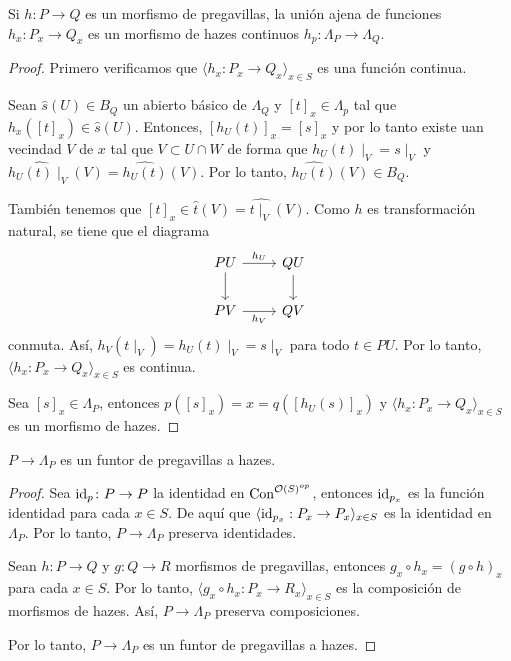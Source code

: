 \begin{lema}
Si $h\colon P\to Q$ es un morfismo de pregavillas, la unión ajena de funciones $h_x\colon P_x\to Q_x$ es un morfismo de hazes continuos $h_p\colon \Lambda_P\to \Lambda_Q$.
\end{lema}

\begin{proof}
Primero verificamos que $\langle h_x: P_x\to Q_x\rangle_{x\in S}$ es una función continua.

Sean $\hat{s}(U)\in B_Q$ un abierto básico de $\Lambda_Q$ y $[t]_x\in \Lambda_p$ tal que $h_x([t]_x)\in \hat{s}(U)$. Entonces, $[h_U(t)]_x=[s]_x$ y por lo tanto existe uan vecindad $V$ de $x$ tal que $V\subset U\cap W$ 
de forma que $h_U(t)\mid_V=s\mid_V$ y $\widehat{h_U(t)\mid_V}(V)=\widehat{h_U(t)}(V)$. Por lo tanto, $\widehat{h_U(t)}(V)\in B_Q$.

También tenemos que $[t]_x\in \hat{t}(V)=\widehat{t\mid_V}(V)$. Como $h$ es transformación natural, se tiene que el diagrama 
\[\begin{tikzcd}
	PU & QU \\
	PV & QV
	\arrow["{h_U}", from=1-1, to=1-2]
	\arrow[from=1-1, to=2-1]
	\arrow[from=1-2, to=2-2]
	\arrow["{h_V}"', from=2-1, to=2-2]
\end{tikzcd}\]
conmuta. Así, $h_V(t\mid_V)=h_U(t)\mid_V=s\mid_V$ para todo $t\in PU$. Por lo tanto, $\langle h_x: P_x\to Q_x\rangle_{x\in S}$ es continua.

Sea $[s]_x\in \Lambda_P$, entonces $p([s]_x)=x=q([h_U(s)]_x)$ y $\langle h_x: P_x\to Q_x\rangle_{x\in S}$ es un morfismo de hazes. 
\end{proof}

\begin{lema}
$P\to \Lambda_P$ es un funtor de pregavillas a hazes.
\end{lema}

\begin{proof}
Sea ${\mathrm{id}}_p\colon P\to P$ la identidad en ${\mathrm{Con}}^{{\mathcal O}(S)^{op}}$, entonces ${\mathrm{id}}_{p_x}$ es la función identidad para cada $x\in S$. De aquí que $\langle {\mathrm{id}}_{p_x}: P_x\to P_x\rangle_{x\in S}$ es la identidad en $\Lambda_P$. Por lo tanto, $P\to \Lambda_P$ preserva identidades.

Sean $h\colon P\to Q$ y $g\colon Q\to R$ morfismos de pregavillas, entonces $g_x\circ h_x=(g\circ h)_x$ para cada $x\in S$. Por lo tanto, $\langle g_x\circ h_x: P_x\to R_x\rangle_{x\in S}$ es la composición de morfismos de hazes. Así, $P\to \Lambda_P$ preserva composiciones.

Por lo tanto, $P\to \Lambda_P$ es un funtor de pregavillas a hazes.
\end{proof}

